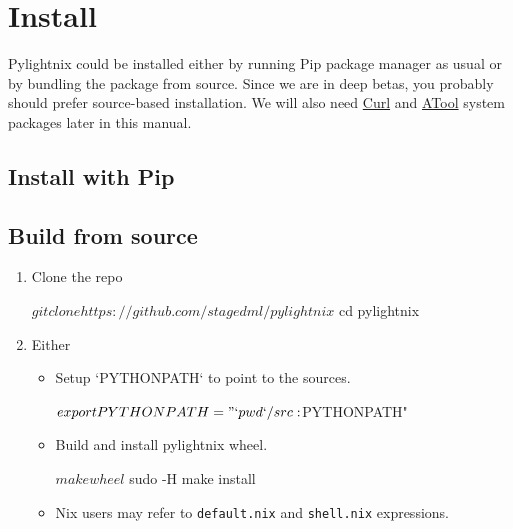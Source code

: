 \section{Install}

Pylightnix could be installed either by running Pip package manager as usual or
by bundling the package from source. Since we are in deep betas, you probably
should prefer source-based installation. We will also need
\href{https://curl.se/}{Curl} and \href{https://www.nongnu.org/atool/}{ATool}
system packages later in this manual.

\subsection{Install with Pip}


\subsection{Build from source}

\begin{enumerate}
  \item Clone the repo
    \begin{shellcode}
    $ git clone https://github.com/stagedml/pylightnix
    $ cd pylightnix
    \end{shellcode}
  \item Either
    \begin{itemize}
      \item Setup `PYTHONPATH` to point to the sources.
        \begin{shellcode}
        $ export PYTHONPATH="`pwd`/src:$PYTHONPATH"
        \end{shellcode}
      \item Build and install pylightnix wheel.
        \begin{shellcode}
        $ make wheel
        $ sudo -H make install
        \end{shellcode}
      \item Nix users may refer to \texttt{default.nix} and
        \texttt{shell.nix} expressions.
    \end{itemize}
\end{enumerate}


